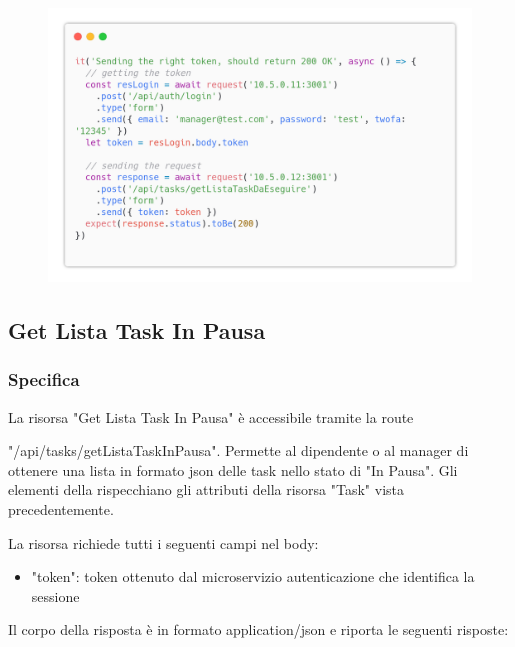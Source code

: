 \documentclass{report}
\begin{document}
\begin{figure}[H]
	\centering\includegraphics[width=1\textwidth]{images/code_da_eseguire_test4.png}
\end{figure}

\subsection{Get Lista Task In Pausa}
\subsubsection*{Specifica}


La risorsa "Get Lista Task In Pausa" è accessibile tramite la route

"/api/tasks/getListaTaskInPausa". Permette al dipendente o al manager di ottenere una lista in formato json delle task nello stato di "In Pausa". Gli elementi della rispecchiano gli attributi della risorsa "Task" vista precedentemente.

La risorsa richiede tutti i seguenti campi nel body:
\begin{itemize}
	\item "token": token ottenuto dal microservizio autenticazione che identifica la sessione
\end{itemize}

Il corpo della risposta è in formato application/json e riporta le seguenti risposte:
\end{document}
